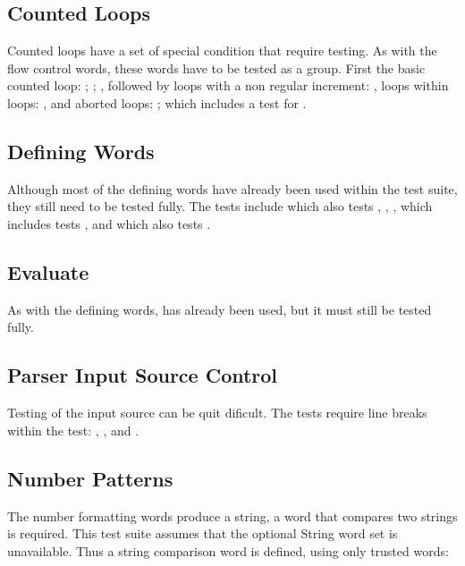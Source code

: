 \subsection{Counted Loops}

Counted loops have a set of special condition that require testing.
As with the flow control words, these words have to be tested as
a group.
First the basic counted loop: ; ;
	,
followed by loops with a non regular increment:
	,
loops within loops:
	,
and aborted loops:
	;
	 which includes a test for .

\subsection{Defining Words}

Although most of the defining words have already been used within the
test suite, they still need to be tested fully.  The tests include
	 which also tests \word{;},
	,
	,
	 which includes tests , and
	 which also tests .

\subsection{Evaluate}

As with the defining words,  has
already been used, but it must still be tested fully.

\subsection{Parser Input Source Control}

Testing of the input source can be quit dificult.  The tests
require line breaks within the test:
	,
	, and
	.

\subsection{Number Patterns}

The number formatting words produce a string, a word that compares
two strings is required.  This test suite assumes that the optional
String word set is unavailable.  Thus a string comparison word is
defined, using only trusted words:

